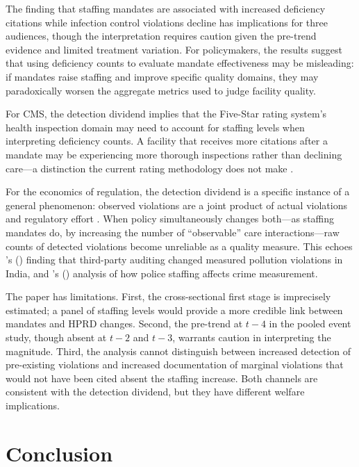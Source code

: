 \documentclass[12pt]{article}
\begin{document}
The finding that staffing mandates are associated with increased deficiency citations while infection control violations decline has implications for three audiences, though the interpretation requires caution given the pre-trend evidence and limited treatment variation. For policymakers, the results suggest that using deficiency counts to evaluate mandate effectiveness may be misleading: if mandates raise staffing and improve specific quality domains, they may paradoxically worsen the aggregate metrics used to judge facility quality.

For CMS, the detection dividend implies that the Five-Star rating system's health inspection domain may need to account for staffing levels when interpreting deficiency counts. A facility that receives more citations after a mandate may be experiencing more thorough inspections rather than declining care---a distinction the current rating methodology does not make \citep{werner2012}.

For the economics of regulation, the detection dividend is a specific instance of a general phenomenon: observed violations are a joint product of actual violations and regulatory effort \citep{glaeser2001}. When policy simultaneously changes both---as staffing mandates do, by increasing the number of ``observable'' care interactions---raw counts of detected violations become unreliable as a quality measure. This echoes \citeauthor{duflo2013}'s (\citeyear{duflo2013}) finding that third-party auditing changed measured pollution violations in India, and \citeauthor{mccrary2017}'s (\citeyear{mccrary2017}) analysis of how police staffing affects crime measurement.

The paper has limitations. First, the cross-sectional first stage is imprecisely estimated; a panel of staffing levels would provide a more credible link between mandates and HPRD changes. Second, the pre-trend at $t-4$ in the pooled event study, though absent at $t-2$ and $t-3$, warrants caution in interpreting the magnitude. Third, the analysis cannot distinguish between increased detection of pre-existing violations and increased documentation of marginal violations that would not have been cited absent the staffing increase. Both channels are consistent with the detection dividend, but they have different welfare implications.

\section{Conclusion}
\end{document}
